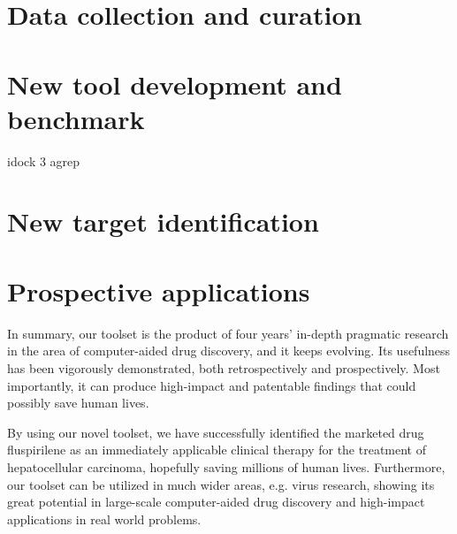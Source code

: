 \documentclass[a4paper,12pt]{article}
\begin{document}
\section*{Data collection and curation}


\section*{New tool development and benchmark}

idock 3
agrep \cite{1138}

\section*{New target identification}


\section*{Prospective applications}

In summary, our toolset is the product of four years’ in-depth pragmatic research in the area of computer-aided drug discovery, and it keeps evolving. Its usefulness has been vigorously demonstrated, both retrospectively and prospectively. Most importantly, it can produce high-impact and patentable findings that could possibly save human lives.

By using our novel toolset, we have successfully identified the marketed drug fluspirilene as an immediately applicable clinical therapy for the treatment of hepatocellular carcinoma, hopefully saving millions of human lives. Furthermore, our toolset can be utilized in much wider areas, e.g. virus research, showing its great potential in large-scale computer-aided drug discovery and high-impact applications in real world problems.

\newpage
\linespread{0.5}
\tiny


\end{document}
